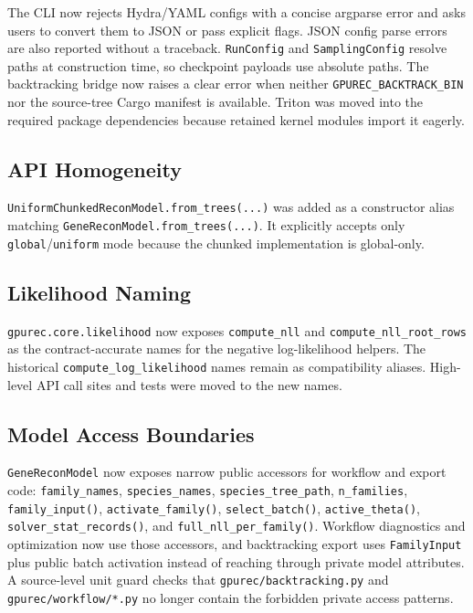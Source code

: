 \documentclass[11pt]{article}
\begin{document}
The CLI now rejects Hydra/YAML configs with a concise argparse error and asks
users to convert them to JSON or pass explicit flags.  JSON config parse errors
are also reported without a traceback.  \texttt{RunConfig} and \texttt{SamplingConfig} resolve
paths at construction time, so checkpoint payloads use absolute paths.  The
backtracking bridge now raises a clear error when neither
\texttt{GPUREC\_BACKTRACK\_BIN} nor the source-tree Cargo manifest is available.
Triton was moved into the required package dependencies because retained kernel
modules import it eagerly.

\subsection{API Homogeneity}

\texttt{UniformChunkedReconModel.from\_trees(...)} was added as a constructor
alias matching \texttt{GeneReconModel.from\_trees(...)}.  It explicitly accepts
only \texttt{global}/\texttt{uniform} mode because the chunked implementation is
global-only.

\subsection{Likelihood Naming}

\texttt{gpurec.core.likelihood} now exposes \texttt{compute\_nll} and
\texttt{compute\_nll\_root\_rows} as the contract-accurate names for the
negative log-likelihood helpers.  The historical
\texttt{compute\_log\_likelihood} names remain as compatibility aliases.
High-level API call sites and tests were moved to the new names.

\subsection{Model Access Boundaries}

\texttt{GeneReconModel} now exposes narrow public accessors for workflow and
export code: \texttt{family\_names}, \texttt{species\_names},
\texttt{species\_tree\_path}, \texttt{n\_families}, \texttt{family\_input()},
\texttt{activate\_family()}, \texttt{select\_batch()},
\texttt{active\_theta()}, \texttt{solver\_stat\_records()}, and
\texttt{full\_nll\_per\_family()}.  Workflow diagnostics and optimization now
use those accessors, and backtracking export uses \texttt{FamilyInput} plus
public batch activation instead of reaching through private model attributes.
A source-level unit guard checks that \texttt{gpurec/backtracking.py} and
\texttt{gpurec/workflow/*.py} no longer contain the forbidden private access
patterns.
\end{document}
